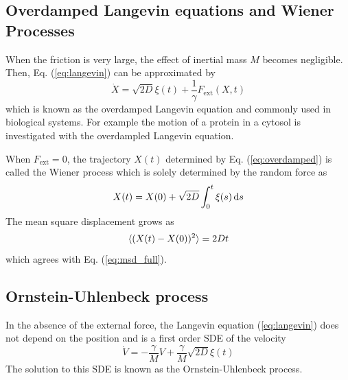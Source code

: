 \subsection{Overdamped Langevin equations and Wiener Processes}

When the friction is very large, the effect of inertial mass $M$ becomes negligible.  Then, Eq. (\ref{eq:langevin}) can be approximated by
\begin{equation}\label{eq:overdamped}
\dot{X} = \sqrt{2D} \xi(t) + \frac{1}{\gamma} F_\text{ext}(X,t)
\end{equation}
which is known as the overdamped Langevin equation\cite{langevin_eq_sekimoto} and commonly used in biological systems.  For example the motion of a protein  in a cytosol is investigated with the overdampled Langevin equation. 

When $F_\text{ext}=0$, the trajectory $X(t)$ determined by Eq. (\ref{eq:overdamped}) is called the Wiener process which is solely determined by the random force as
\begin{equation}\label{eq:od_displacement}
X(t) = X(0) + \sqrt{2D} \int_0^t \xi(s)\, \text{d} s
\end{equation}
The mean square displacement grows as
\begin{equation}\label{eq:msd_od}
\langle (X(t)-X(0))^2 \rangle = 2D t
\end{equation}
which agrees with Eq. (\ref{eq:msd_full}).


\subsection{Ornstein-Uhlenbeck process}

In the absence of the external force, the Langevin equation (\ref{eq:langevin}) does not depend on the position and is a first order SDE of the velocity
\begin{equation}\label{eq:ou_v}
\dot{V} = -\frac{\gamma}{M} V + \frac{\gamma}{M} \sqrt{2D} \xi(t)
\end{equation}
The solution to this SDE is known as the Ornstein-Uhlenbeck process.

